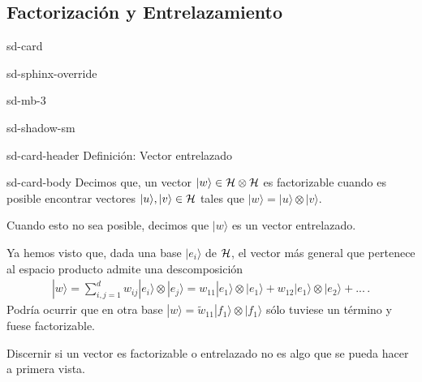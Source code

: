 \documentclass[letterpaper,10pt,english]{jupyterBook}
\newcommand{\ket}[1]{|#1\rangle}
\newcommand{\Hil}{{\cal H}}
\begin{document}
\subsection{Factorización y Entrelazamiento}
\label{\detokenize{docs/Part_01_Formalismo/Chapter_01_02_Formalismo_matem_xe1tico/01_04_Tensores_myst:factorizacion-y-entrelazamiento}}
\begin{sphinxuseclass}{sd-card}
\begin{sphinxuseclass}{sd-sphinx-override}
\begin{sphinxuseclass}{sd-mb-3}
\begin{sphinxuseclass}{sd-shadow-sm}
\begin{sphinxuseclass}{sd-card-header}
\sphinxAtStartPar
Definición: Vector entrelazado

\end{sphinxuseclass}
\begin{sphinxuseclass}{sd-card-body}
\sphinxAtStartPar
Decimos que, un vector \(\ket{w}\in \Hil\otimes\Hil\) es factorizable cuando es posible encontrar vectores \(\ket{u},\ket{v}\in \Hil\) tales que \( \ket{w} = \ket{u}\otimes\ket{v}\).

\sphinxAtStartPar
Cuando esto no sea posible, decimos que  \(\ket{w}\) es un vector entrelazado.

\end{sphinxuseclass}
\end{sphinxuseclass}
\end{sphinxuseclass}
\end{sphinxuseclass}
\end{sphinxuseclass}
\sphinxAtStartPar
Ya hemos visto que, dada una base \(\ket{e_i}\) de \(\Hil\), el vector más general que pertenece al espacio producto admite una descomposición
\begin{equation*}
\begin{split}
\ket{w} = \sum_{i,j=1}^d w_{ij}\ket{e_{i}}\otimes \ket{e_j} = w_{11}\ket{e_1}\otimes\ket{e_1} + w_{12}\ket{e_1}\otimes\ket{e_2} + ...\, .
\end{split}
\end{equation*}
\sphinxAtStartPar
Podría ocurrir que en otra base \(\ket{w} = \tilde w_{11} \ket{f_1}\otimes\ket{f_1}\) sólo tuviese un término y fuese factorizable.

\sphinxAtStartPar
Discernir si un vector es factorizable o entrelazado no es algo que se pueda hacer a primera vista.
\end{document}
